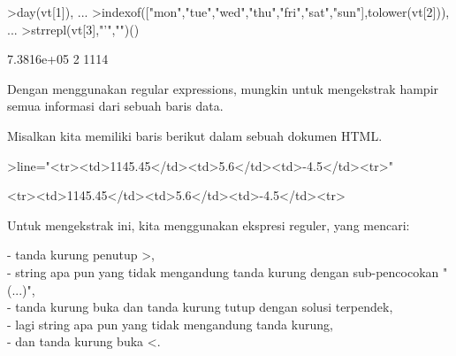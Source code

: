 \documentclass[12pt,arial,letterpaper]{book}
\begin{document}
\begin{eulercomment}
\begin{eulercomment}
\begin{eulercomment}
\begin{eulercomment}
\begin{eulercomment}
\begin{eulercomment}
\begin{eulercomment}
\begin{eulercomment}
\begin{eulercomment}
\begin{eulercomment}
\begin{eulercomment}
\begin{eulercomment}
\begin{eulercomment}
\begin{eulercomment}
\begin{eulercomment}
\begin{eulercomment}
\begin{eulercomment}
\begin{eulercomment}
\begin{eulercomment}
\begin{eulercomment}
\begin{eulercomment}
\begin{eulercomment}
\begin{eulercomment}
\begin{eulercomment}
\begin{eulercomment}
\begin{eulercomment}
\begin{eulercomment}
\begin{eulercomment}
\begin{eulercomment}
\begin{eulercomment}
\begin{eulercomment}
\begin{eulercomment}
\begin{eulercomment}
\begin{eulercomment}
\begin{eulercomment}
\begin{eulercomment}
\begin{eulercomment}
\begin{eulercomment}
\begin{eulerprompt}
>day(vt[1]),  ...
>indexof(["mon","tue","wed","thu","fri","sat","sun"],tolower(vt[2])),  ...
>strrepl(vt[3],"'","")()
\end{eulerprompt}
\begin{euleroutput}
  7.3816e+05
  2
  1114
\end{euleroutput}
\begin{eulercomment}
Dengan menggunakan regular expressions, mungkin untuk mengekstrak
hampir semua informasi dari sebuah baris data.

Misalkan kita memiliki baris berikut dalam sebuah dokumen HTML.
\end{eulercomment}
\begin{eulerprompt}
>line="<tr><td>1145.45</td><td>5.6</td><td>-4.5</td><tr>"
\end{eulerprompt}
\begin{euleroutput}
  <tr><td>1145.45</td><td>5.6</td><td>-4.5</td><tr>
\end{euleroutput}
\begin{eulercomment}
Untuk mengekstrak ini, kita menggunakan ekspresi reguler, yang
mencari:

- tanda kurung penutup \textgreater{},\\
- string apa pun yang tidak mengandung tanda kurung dengan
sub-pencocokan "(...)",\\
- tanda kurung buka dan tanda kurung tutup dengan solusi terpendek,\\
- lagi string apa pun yang tidak mengandung tanda kurung,\\
- dan tanda kurung buka \textless{}.


\end{eulercomment}
\end{eulercomment}
\end{eulercomment}
\end{eulercomment}
\end{eulercomment}
\end{eulercomment}
\end{eulercomment}
\end{eulercomment}
\end{eulercomment}
\end{eulercomment}
\end{eulercomment}
\end{eulercomment}
\end{eulercomment}
\end{eulercomment}
\end{eulercomment}
\end{eulercomment}
\end{eulercomment}
\end{eulercomment}
\end{eulercomment}
\end{eulercomment}
\end{eulercomment}
\end{eulercomment}
\end{eulercomment}
\end{eulercomment}
\end{eulercomment}
\end{eulercomment}
\end{eulercomment}
\end{eulercomment}
\end{eulercomment}
\end{eulercomment}
\end{eulercomment}
\end{eulercomment}
\end{eulercomment}
\end{eulercomment}
\end{eulercomment}
\end{eulercomment}
\end{eulercomment}
\end{eulercomment}
\end{eulercomment}
\end{document}
